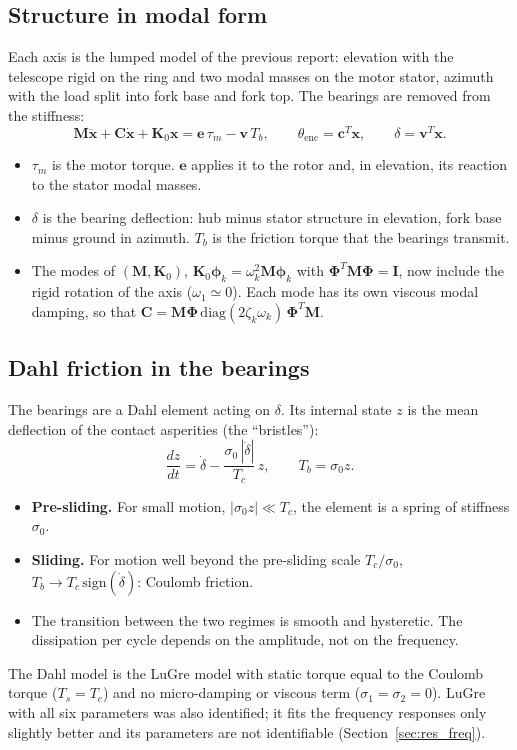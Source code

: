 \documentclass[10pt,a4paper]{article}
\numberwithin{equation}{section}
\begin{document}
\subsection{Structure in modal form}
Each axis is the lumped model of the previous report: elevation with the telescope rigid on the ring and two modal masses on the motor stator, azimuth with the load split into fork base and fork top. The bearings are removed from the stiffness:
\begin{equation}
\mathbf M\ddot{\mathbf x}+\mathbf C\dot{\mathbf x}+\mathbf K_0\mathbf x=\mathbf e\,\tau_m-\mathbf v\,T_b,\qquad \theta_\mathrm{enc}=\mathbf c^T\mathbf x,\qquad \delta=\mathbf v^T\mathbf x .\label{eq:struct}
\end{equation}
\begin{itemize}
\item $\tau_m$ is the motor torque. $\mathbf e$ applies it to the rotor and, in elevation, its reaction to the stator modal masses.
\item $\delta$ is the bearing deflection: hub minus stator structure in elevation, fork base minus ground in azimuth. $T_b$ is the friction torque that the bearings transmit.
\item The modes of $(\mathbf M,\mathbf K_0)$, $\mathbf K_0\bm\phi_k=\omega_k^2\mathbf M\bm\phi_k$ with $\bm\Phi^T\mathbf M\bm\Phi=\mathbf I$, now include the rigid rotation of the axis ($\omega_1\simeq0$). Each mode has its own viscous modal damping, so that $\mathbf C=\mathbf M\bm\Phi\,\mathrm{diag}(2\zeta_k\omega_k)\,\bm\Phi^T\mathbf M$.
\end{itemize}

\subsection{Dahl friction in the bearings}
The bearings are a Dahl element acting on $\delta$. Its internal state $z$ is the mean deflection of the contact asperities (the ``bristles''):
\begin{equation}
\frac{dz}{dt}=\dot\delta-\frac{\sigma_0\,|\dot\delta|}{T_c}\,z,\qquad T_b=\sigma_0 z .\label{eq:dahl}
\end{equation}
\begin{itemize}
\item \textbf{Pre-sliding.} For small motion, $|\sigma_0 z|\ll T_c$, the element is a spring of stiffness $\sigma_0$.
\item \textbf{Sliding.} For motion well beyond the pre-sliding scale $T_c/\sigma_0$, $T_b\to T_c\,\mathrm{sign}(\dot\delta)$: Coulomb friction.
\item The transition between the two regimes is smooth and hysteretic. The dissipation per cycle depends on the amplitude, not on the frequency.
\end{itemize}
The Dahl model is the LuGre model with static torque equal to the Coulomb torque ($T_s=T_c$) and no micro-damping or viscous term ($\sigma_1=\sigma_2=0$). LuGre with all six parameters was also identified; it fits the frequency responses only slightly better and its parameters are not identifiable (Section~\ref{sec:res_freq}).
\end{document}
